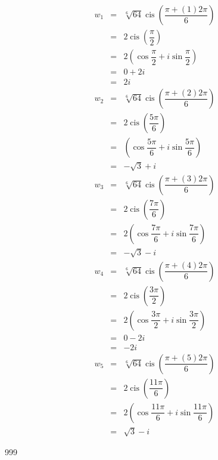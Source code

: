 \documentclass[a4paper]{article}
\DeclareMathOperator{\cis}{cis}
\begin{document}
\begin{eqnarray*}
w_1 & = & \sqrt[6]{64}\cis\left(\dfrac{\pi + (1)2\pi}{6}\right) \\
& = & 2\cis\left(\dfrac{\pi}{2}\right) \\
& = & 2\left(\cos\dfrac{\pi}{2} + i\sin\dfrac{\pi}{2}\right) \\
& = & 0 + 2i \\
& = & 2i
\end{eqnarray*}\begin{eqnarray*}
w_2 & = & \sqrt[6]{64}\cis\left(\dfrac{\pi + (2)2\pi}{6}\right) \\
& = & 2\cis\left(\dfrac{5\pi}{6}\right) \\
& = & \left(\cos\dfrac{5\pi}{6} + i\sin\dfrac{5\pi}{6} \right) \\
& = & -\sqrt{3} + i
\end{eqnarray*}\begin{eqnarray*}
w_3 & = & \sqrt[6]{64}\cis\left(\dfrac{\pi + (3)2\pi}{6}\right) \\
& = & 2\cis\left(\dfrac{7\pi}{6}\right) \\
& = & 2\left(\cos\dfrac{7\pi}{6} + i\sin\dfrac{7\pi}{6}\right) \\
& = & -\sqrt{3} - i
\end{eqnarray*}\begin{eqnarray*}
w_4 & = & \sqrt[6]{64}\cis\left(\dfrac{\pi + (4)2\pi}{6}\right) \\
& = & 2\cis\left(\dfrac{3\pi}{2}\right) \\
& = & 2\left(\cos\dfrac{3\pi}{2} + i\sin\dfrac{3\pi}{2}\right) \\
& = & 0 - 2i \\
& = & -2i
\end{eqnarray*}\begin{eqnarray*}
w_5 & = & \sqrt[6]{64}\cis\left(\dfrac{\pi + (5)2\pi}{6}\right) \\
& = & 2\cis\left(\dfrac{11\pi}{6}\right) \\
& = & 2\left(\cos\dfrac{11\pi}{6} + i\sin\dfrac{11\pi}{6}\right) \\
& = & \sqrt{3} - i
\end{eqnarray*}





\begin{thebibliography}{999}
\end{thebibliography}
\end{document}
